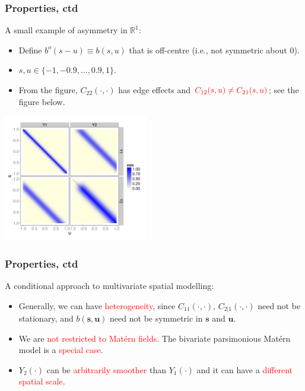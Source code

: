 \documentclass{beamer}
\newcommand{\svec} {\textbf{s}}
\newcommand{\uvec} {\textbf{u}}
\begin{document}

\begin{frame}
\frametitle{Properties, ctd}
\vspace{-.5cm}
A small example of asymmetry in $\mathbb{R}^1$:
\begin{itemize}
\item Define $b^o(s-u) \equiv b(s,u)$ that is off-centre (i.e., not symmetric about 0).
\item $s,u \in \{-1, -0.9 ,\dots,0.9, 1\}$.
\item From the figure, $C_{22}(\cdot,\cdot)$ has edge effects and $\textcolor{red}{C_{12}(s,u)\neq C_{21}(s,u)}$; see the figure below.
\end{itemize}
\vspace{-.9cm}
\begin{center}
\hfill\includegraphics[width=2.5in]{Sigma.png}
\end{center}
\end{frame}


\begin{frame}
\frametitle{Properties, ctd}
A conditional approach to multivariate spatial modelling:
\begin{itemize}
\item Generally, we can have \textcolor{red}{heterogeneity}, since $C_{11}(\cdot,\cdot)$, $C_{2|1}(\cdot,\cdot)$ need not be stationary, and $b(\svec,\uvec)$ need not be symmetric in $\svec$ and $\uvec$. \vfill

\item We are \textcolor{red}{not restricted to Matérn fields}. The bivariate parsimonious Matérn model is a \textcolor{red}{special case}.\vfill

\item $Y_2(\cdot)$ can be \textcolor{red}{arbitrarily smoother} than $Y_1(\cdot)$ and it can have a \textcolor{red}{different spatial scale}.\vfill

\end{itemize}
\end{frame}
\end{document}
